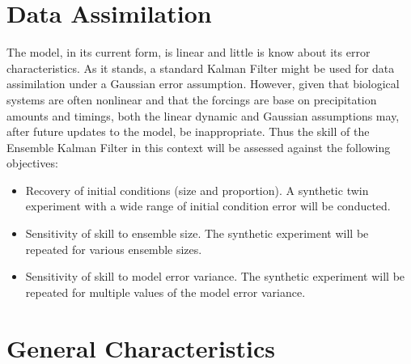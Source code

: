 \documentclass[fleqn, letterpaper]{amsart}
\begin{document}
\section{Data Assimilation}
The model, in its current form, is linear and little is know about its error characteristics. As it stands, a standard Kalman Filter might be used for data assimilation under a Gaussian error assumption. However, given that biological systems are often nonlinear and that the forcings are base on precipitation amounts and timings, both the linear dynamic and Gaussian assumptions may, after future updates to the model, be inappropriate. Thus the skill of the Ensemble Kalman Filter in this context will be assessed against the following objectives:
\begin{itemize}
  \item Recovery of initial conditions (size and proportion). A synthetic twin experiment with a wide range of initial condition error will be conducted.
  \item Sensitivity of skill to ensemble size. The synthetic experiment will be repeated for various ensemble sizes.
  \item Sensitivity of skill to model error variance. The synthetic experiment will be repeated for multiple values of the model error variance.
  \end{itemize}

\section{General Characteristics}
\end{document}
